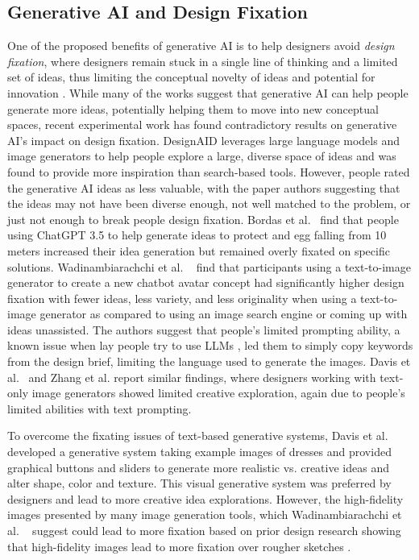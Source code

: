\documentclass[sigconf, screen]{acmart}
\begin{document}
\subsection{Generative AI and Design Fixation}
One of the proposed benefits of generative AI is to help designers avoid \textit{design fixation}, where designers remain stuck in a single line of thinking and a limited set of ideas, thus limiting the conceptual novelty of ideas and potential for innovation \cite{jansson1991design}.
While many of the works suggest that generative AI can help people generate more ideas, potentially helping them to move into new conceptual spaces, recent experimental work has found contradictory results on generative AI's impact on design fixation.
DesignAID \cite{cai2024DesignAID} leverages large language models and image generators to help people explore a large, diverse space of ideas and was found to provide more inspiration than search-based tools.
However, people rated the generative AI ideas as less valuable, with the paper authors suggesting that the ideas may not have been diverse enough, not well matched to the problem, or just not enough to break people design fixation.
Bordas et al.~\cite{bordas2024switching} find that people using ChatGPT 3.5 to help generate ideas to protect and egg falling from 10 meters increased their idea generation but remained overly fixated on specific solutions.
Wadinambiarachchi et al. ~\cite{Wadinambiarachchi2024effects} find that participants using a text-to-image generator to create a new chatbot avatar concept had significantly higher design fixation with fewer ideas, less variety, and less originality when using a text-to-image generator as compared to using an image search engine or coming up with ideas unassisted.
The authors suggest that people's limited prompting ability, a known issue when lay people try to use LLMs \cite{zamfirescu2023johnny}, led them to simply copy keywords from the design brief, limiting the language used to generate the images.
Davis et al.~\cite{davis2024fashioning} and Zhang et al. \cite{zhang2023generative} report similar findings, where designers working with text-only image generators showed limited creative exploration, again due to people's limited abilities with text prompting.

To overcome the fixating issues of text-based generative systems, Davis et al.~\cite{davis2024fashioning} developed a generative system taking example images of dresses and provided graphical buttons and sliders to generate more realistic vs. creative ideas and alter shape, color and texture. 
This visual generative system was preferred by designers and lead to more creative idea explorations.
However, the high-fidelity images presented by many image generation tools, which Wadinambiarachchi et al. ~\cite{Wadinambiarachchi2024effects} suggest could lead to more fixation based on prior design research showing that high-fidelity images lead to more fixation over rougher sketches \cite{cardoso2009design, cheng2014new}.
\end{document}

